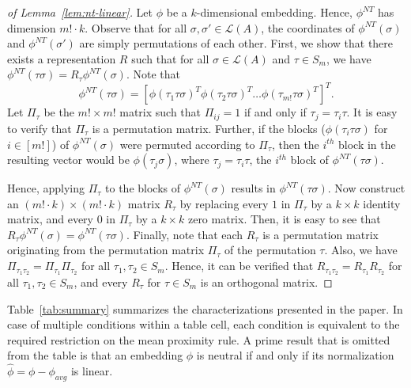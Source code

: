 \documentclass[prodmode,acmec]{ec-acmsmall}
\newcommand{\calL}{{\mathcal{L}}}
\newcommand{\rank}{{\calL(A)}}
\newcommand{\nt}{NT}
\begin{document}
\begin{proof}[of Lemma~\ref{lem:nt-linear}]
Let $\phi$ be a $k$-dimensional embedding. Hence, $\phi^{\nt}$ has dimension $m! \cdot k$. Observe that for all $\sigma,\sigma' \in \rank$, the coordinates of $\phi^{\nt}(\sigma)$ and $\phi^{\nt}(\sigma')$ are simply permutations of each other. First, we show that there exists a representation $R$ such that for all $\sigma \in \rank$ and $\tau \in S_m$, we have $\phi^{\nt}(\tau \sigma) = R_{\tau}\phi^{\nt}(\sigma)$. Note that 
$$
\phi^{\nt}(\tau \sigma) = [\phi(\tau_1 \tau \sigma)^T \phi(\tau_2 \tau \sigma)^T \ldots \phi(\tau_{m!} \tau \sigma)^T]^T.
$$
Let $\Pi_{\tau}$ be the $m! \times m!$ matrix such that $\Pi_{ij} = 1$ if and only if $\tau_j = \tau_i \tau$. It is easy to verify that $\Pi_{\tau}$ is a permutation matrix. Further, if the blocks ($\phi(\tau_i \tau \sigma)$ for $i \in [m!]$) of $\phi^{\nt}(\sigma)$ were permuted according to $\Pi_{\tau}$, then the $i^{th}$ block in the resulting vector would be $\phi(\tau_j \sigma)$, where $\tau_j = \tau_i \tau$, the $i^{th}$ block of $\phi^{\nt}(\tau \sigma)$. 

Hence, applying $\Pi_{\tau}$ to the blocks of $\phi^{\nt}(\sigma)$ results in $\phi^{\nt}(\tau \sigma)$. Now construct an $(m! \cdot k) \times (m! \cdot k)$ matrix $R_{\tau}$ by replacing every $1$ in $\Pi_{\tau}$ by a $k\times k$ identity matrix, and every $0$ in $\Pi_{\tau}$ by a $k\times k$ zero matrix. Then, it is easy to see that $R_{\tau} \phi^{\nt}(\sigma) = \phi^{\nt}(\tau \sigma)$. Finally, note that each $R_{\tau}$ is a permutation matrix originating from the permutation matrix $\Pi_{\tau}$ of the permutation $\tau$. Also, we have $\Pi_{\tau_1 \tau_2} = \Pi_{\tau_1} \Pi_{\tau_2}$ for all $\tau_1,\tau_2 \in S_m$. Hence, it can be verified that $R_{\tau_1 \tau_2} = R_{\tau_1} R_{\tau_2}$ for all $\tau_1,\tau_2 \in S_m$, and every $R_{\tau}$ for $\tau \in S_m$ is an orthogonal matrix.
\end{proof}

Table~\ref{tab:summary} summarizes the characterizations presented in the paper. In case of multiple conditions within a table cell, each condition is equivalent to the required restriction on the mean proximity rule. A prime result that is omitted from the table is that an embedding $\phi$ is neutral if and only if its normalization $\hat{\phi} = \phi-\phi_{avg}$ is linear. 
\end{document}
